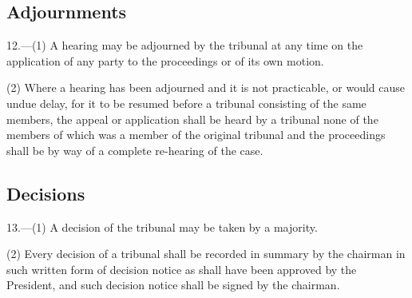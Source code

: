 \documentclass[a4paper]{article}
\begin{document}
\subsection[12. Adjournments]{Adjournments}

12.—(1) A hearing may be adjourned by the tribunal at any time on the application of any party to the proceedings or of its own motion.

(2) Where a hearing has been adjourned and it is not practicable, or would cause undue delay, for it to be resumed before a tribunal consisting of the same members, the appeal or application shall be heard by a tribunal none of the members of which was a member of the original tribunal and the proceedings shall be by way of a complete re-hearing of the case.

\subsection[13. Decisions]{Decisions}

13.—(1) A decision of the tribunal may be taken by a majority.

%
%

(2) Every decision of a tribunal shall be recorded in summary by the chairman in such written form of decision notice as shall have been approved by the President, and such decision notice shall be signed by the chairman.

%
\end{document}
